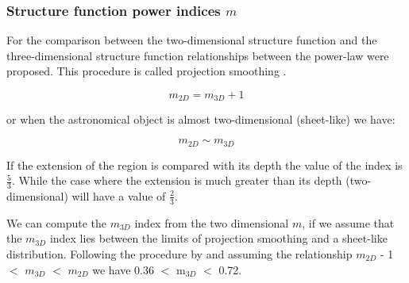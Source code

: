 \documentclass[fleqn,usenatbib, useAMS, a4paper]{mnras}
\begin{document}

\subsubsection{Structure function power indices \(m\)}


For the comparison between the two-dimensional structure function and the three-dimensional structure function relationships between the power-law were proposed.
This procedure is called projection smoothing \citep{von1951methode, munch1958internal,1987ApJ...317..686O}.

\begin{equation}\label{eq:exp1}
m_{2D}= m_{3D} + 1
\end{equation}

or when the astronomical object is almost two-dimensional (sheet-like) we have:

\begin{equation}\label{eq:exp2}
m_{2D} \sim m_{3D}
\end{equation}

If the extension of the region is compared with its depth the value of the index is $\frac{5}{3}$. While the case where the extension is much greater than its depth (two-dimensional) will have a value of $\frac{2}{3}$.

We can compute the $m_{3D}$ index from the two dimensional \(m\), if we assume that the $m_{3D}$ index lies between the limits of projection smoothing and a sheet-like distribution. 
Following the procedure by \cite{arthur2016turbulence} and assuming the relationship $m_{2D}$ - 1 $<$ $m_{3D}$ $<$ $m_{2D}$ we have 0.36 $<$ m$_{3D}$ $<$ 0.72.
\end{document}
